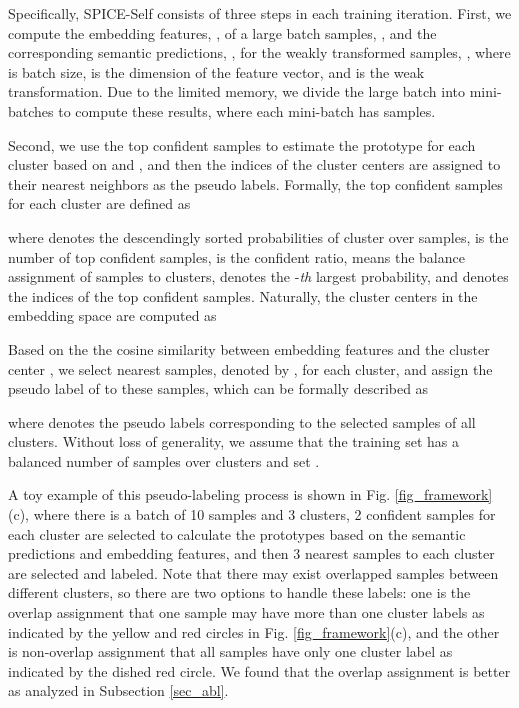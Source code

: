 \documentclass[10pt,twocolumn,letterpaper]{article}
\begin{document}
Specifically, SPICE-Self consists of three steps in each training iteration.
First, we compute the embedding features, , of a large batch samples, , and the corresponding semantic predictions, , for the weakly transformed samples, , where
 is batch size,
 is the dimension of the feature vector, and
 is the weak transformation.
Due to the limited memory, we divide the large batch into mini-batches to compute these results, where each mini-batch has  samples.

Second, we use the top confident samples to estimate the prototype for each cluster based on  and , and then the indices of the cluster centers are assigned to their nearest neighbors as the pseudo labels.
Formally, the top confident samples for each cluster are defined as

where  denotes the descendingly sorted probabilities of cluster  over  samples,
 is the number of top confident samples,  is the confident ratio,  means the balance assignment of  samples to  clusters,  denotes the -\emph{th} largest probability, and  denotes the indices of the top confident samples.
Naturally, the cluster centers  in the embedding space are computed as

Based on the the cosine similarity between embedding features and the cluster center , we select  nearest samples, denoted by , for each cluster, and assign the pseudo label of  to these samples, which can be formally described as

where  denotes the pseudo labels corresponding to the selected samples  of all clusters.
Without loss of generality, we assume that the training set has a balanced number of samples over clusters and set .

A toy example of this pseudo-labeling process is shown in Fig. \ref{fig_framework}(c), where there is a batch of 10 samples and 3 clusters, 2 confident samples for each cluster are selected to calculate the prototypes based on the semantic predictions and embedding features, and then 3 nearest samples to each cluster are selected and labeled. Note that there may exist overlapped samples between different clusters, so there are two options to handle these labels: one is the overlap assignment that one sample may have more than one cluster labels as indicated by the yellow and red circles in Fig. \ref{fig_framework}(c), and the other is non-overlap assignment that all samples have only one cluster label as indicated by the dished red circle. We found that the overlap assignment is better as analyzed in Subsection \ref{sec_abl}.
\end{document}
